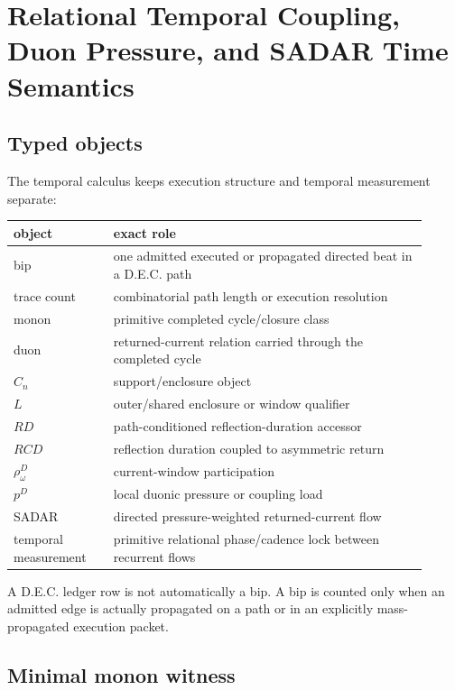 \section{Relational Temporal Coupling, Duon Pressure, and SADAR Time Semantics}
\label{app:manual1-relational-temporal-semantics}

\subsection{Typed objects}

The temporal calculus keeps execution structure and temporal measurement
separate:
\begin{center}
\begin{tabular}{@{}p{0.22\linewidth}p{0.69\linewidth}@{}}
\toprule
object & exact role \\
\midrule
bip & one admitted executed or propagated directed beat in a D.E.C. path \\
trace count & combinatorial path length or execution resolution \\
monon & primitive completed cycle/closure class \\
duon & returned-current relation carried through the completed cycle \\
\(C_n\) & support/enclosure object \\
\(L\) & outer/shared enclosure or window qualifier \\
\(RD\) & path-conditioned reflection-duration accessor \\
\(RCD\) & reflection duration coupled to asymmetric return \\
\(\rho_\omega^D\) & current-window participation \\
\(p^D\) & local duonic pressure or coupling load \\
SADAR & directed pressure-weighted returned-current flow \\
temporal measurement & primitive relational phase/cadence lock between recurrent flows \\
\bottomrule
\end{tabular}
\end{center}

A D.E.C. ledger row is not automatically a bip.  A bip is counted only when
an admitted edge is actually propagated on a path or in an explicitly mass-
propagated execution packet.

\subsection{Minimal monon witness}

